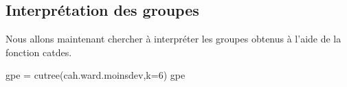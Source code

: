 \documentclass[
]{article}
\newenvironment{Shaded}{}{}
\newcommand{\AttributeTok}[1]{#1}
\newcommand{\DecValTok}[1]{#1}
\newcommand{\FunctionTok}[1]{#1}
\newcommand{\NormalTok}[1]{#1}
\newcommand{\OtherTok}[1]{\textcolor[rgb]{1.00,0.25,0.00}{#1}}
\begin{document}
\hypertarget{interpruxe9tation-des-groupes-1}{%
\subsection{Interprétation des
groupes}\label{interpruxe9tation-des-groupes-1}}

Nous allons maintenant chercher à interpréter les groupes obtenus à
l'aide de la fonction catdes.

\begin{Shaded}
\begin{Highlighting}[]
\NormalTok{gpe }\OtherTok{=} \FunctionTok{cutree}\NormalTok{(cah.ward.moinsdev,}\AttributeTok{k=}\DecValTok{6}\NormalTok{)}
\NormalTok{gpe}
\end{Highlighting}
\end{Shaded}
\end{document}
